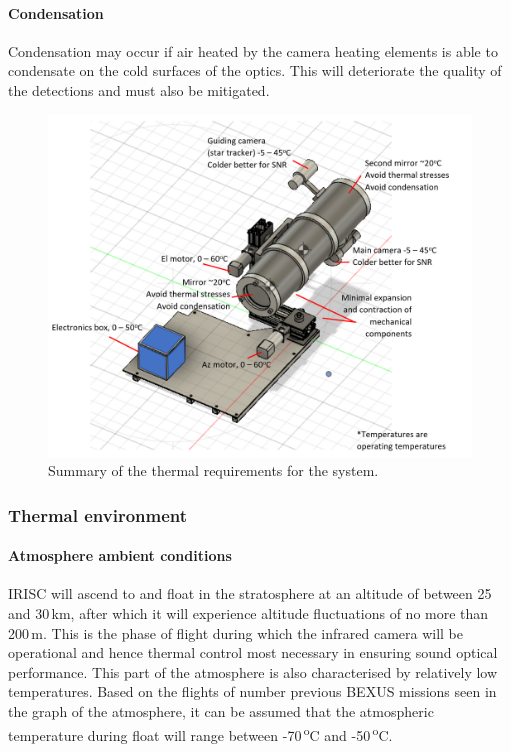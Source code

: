 \paragraph{Condensation}
Condensation may occur if air heated by the camera heating elements is able to condensate on the cold surfaces of the optics. This will deteriorate the quality of the detections and must also be mitigated.  \

	\begin{figure}[h!]
    \centering
    \includegraphics[scale=0.8]{4-experiment-design/img/mechanical/thermalrequirements.PNG}
    	\caption{Summary of the thermal requirements for the system.}
	\label{fig:thermalrequirements}
	\end{figure}


















\subsubsection{Thermal environment}
\paragraph{Atmosphere ambient conditions}
IRISC will ascend to and float in the stratosphere at an altitude of between 25 and 30\,km, after which it will experience altitude fluctuations of no more than 200\,m. This is the phase of flight during which the infrared camera will be operational and hence thermal control most necessary in ensuring sound optical performance. This part of the atmosphere is also characterised by relatively low temperatures. Based on the flights of number previous BEXUS missions seen in the graph of the atmosphere, it can be assumed that the atmospheric temperature during float will range between -70\,\textsuperscript{o}C and -50\,\textsuperscript{o}C. \\

